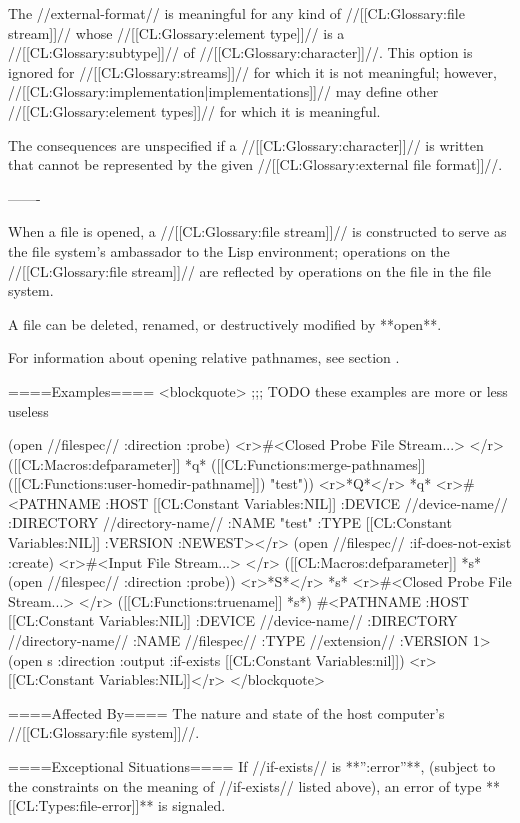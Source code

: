 The //external-format// is meaningful for any kind of //[[CL:Glossary:file stream]]// whose //[[CL:Glossary:element type]]// is a //[[CL:Glossary:subtype]]// of //[[CL:Glossary:character]]//. This option is ignored for //[[CL:Glossary:streams]]// for which it is not meaningful; however, //[[CL:Glossary:implementation|implementations]]// may define other //[[CL:Glossary:element types]]// for which it is meaningful.

The consequences are unspecified if a //[[CL:Glossary:character]]// is written that cannot be represented by the given //[[CL:Glossary:external file format]]//.

-------

When a file is opened, a //[[CL:Glossary:file stream]]// is constructed to serve as the file system's ambassador to the Lisp environment; operations on the //[[CL:Glossary:file stream]]// are reflected by operations on the file in the file system.

A file can be deleted, renamed, or destructively modified by **open**.

For information about opening relative pathnames, see section {\secref\MergingPathnames}.

====Examples====
<blockquote>
;;; TODO these examples are more or less useless

(open //filespec// :direction :probe) <r>#<Closed Probe File Stream...> </r>
([[CL:Macros:defparameter]] *q* ([[CL:Functions:merge-pathnames]] ([[CL:Functions:user-homedir-pathname]]) "test")) <r>*Q*</r>
*q*
<r>#<PATHNAME :HOST [[CL:Constant Variables:NIL]] :DEVICE //device-name// :DIRECTORY //directory-name// 
           :NAME "test" :TYPE [[CL:Constant Variables:NIL]] :VERSION :NEWEST></r>
(open //filespec// :if-does-not-exist :create) <r>#<Input File Stream...> </r>
([[CL:Macros:defparameter]] *s* (open //filespec// :direction :probe)) <r>*S*</r>
*s* <r>#<Closed Probe File Stream...> </r>
([[CL:Functions:truename]] *s*) 
#<PATHNAME :HOST [[CL:Constant Variables:NIL]] :DEVICE //device-name// :DIRECTORY //directory-name// 
           :NAME //filespec// :TYPE //extension// :VERSION 1>
(open s :direction :output :if-exists [[CL:Constant Variables:nil]]) <r>[[CL:Constant Variables:NIL]]</r>
</blockquote>

====Affected By====
The nature and state of the host computer's //[[CL:Glossary:file system]]//.

====Exceptional Situations====
If //if-exists// is **'':error''**, (subject to the constraints on the meaning of //if-exists// listed above), an error of type **[[CL:Types:file-error]]** is signaled.

